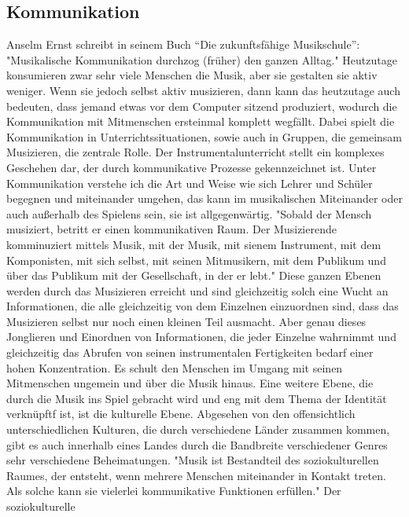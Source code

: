 \subsection{Kommunikation}
Anselm Ernst schreibt in seinem Buch \enquote{Die zukunftsfähige Musikschule}: "Musikalische Kommunikation durchzog (früher) den ganzen Alltag."
\autocite[37]{ernst:die_zukunftsfaehige_musikschule} Heutzutage konsumieren zwar
sehr viele Menschen die Musik, aber sie gestalten sie aktiv weniger. Wenn sie
jedoch selbst aktiv musizieren, dann kann das heutzutage auch bedeuten, dass
jemand etwas vor dem Computer sitzend produziert, wodurch die Kommunikation mit
Mitmenschen ersteinmal komplett wegfällt.
Dabei spielt die Kommunikation in Unterrichtssituationen, sowie auch in Gruppen, die
gemeinsam Musizieren, die zentrale Rolle. Der Instrumentalunterricht stellt ein komplexes Geschehen dar, der
durch
kommunikative Prozesse gekennzeichnet ist. %
Unter Kommunikation verstehe ich die Art und Weise wie sich Lehrer und Schüler
begegnen und miteinander umgehen, das kann im musikalischen Miteinander oder
auch außerhalb des Spielens sein, sie ist allgegenwärtig. 
"Sobald der Mensch musiziert, betritt er einen kommunikativen Raum. Der
Musizierende komminuziert mittels Musik, mit der Musik, mit sienem Instrument,
mit dem Komponisten, mit sich selbst, mit seinen Mitmusikern, mit dem Publikum
und über das Publikum mit der Gesellschaft, in der er lebt." \autocite[56]{doerne:umfassend_musizieren}
Diese ganzen Ebenen werden durch das Musizieren erreicht und sind gleichzeitig
solch eine Wucht an Informationen, die alle gleichzeitig von dem Einzelnen
einzuordnen sind, dass das Musizieren selbst nur noch einen kleinen Teil
ausmacht. Aber genau dieses Jonglieren und Einordnen von Informationen, die
jeder Einzelne wahrnimmt und gleichzeitig das Abrufen von seinen instrumentalen
Fertigkeiten bedarf einer hohen Konzentration. Es schult den Menschen im Umgang
mit seinen Mitmenschen ungemein und über die Musik hinaus. Eine weitere Ebene,
die durch die Musik ins Spiel gebracht wird und eng mit dem Thema der
Identität verknüpftf ist, ist die kulturelle Ebene. Abgesehen von den
offensichtlich unterschiedlichen Kulturen, die durch verschiedene Länder
zusammen kommen, gibt es auch innerhalb eines Landes durch die Bandbreite
verschiedener Genres sehr verschiedene Beheimatungen. 
"Musik ist Bestandteil des soziokulturellen Raumes, der entsteht, wenn mehrere
Menschen miteinander in Kontakt treten. Als solche kann sie vielerlei
kommunikative Funktionen erfüllen." \autocite[56]{doerne:umfassend_musizieren} Der soziokulturelle

